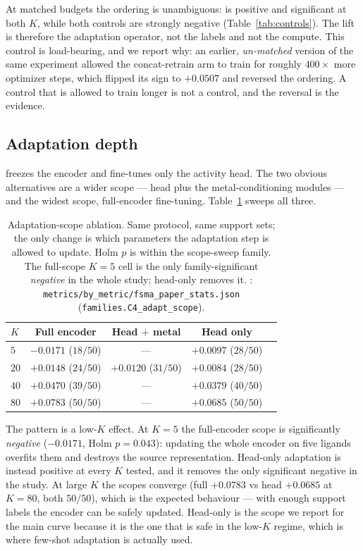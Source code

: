 At matched budgets the ordering is unambiguous: \fsma{} is positive and
significant at both $K$, while both controls are strongly negative
(Table~\ref{tab:controls}). The lift is therefore the adaptation operator, not
the labels and not the compute. This control is load-bearing, and we report why:
an earlier, \emph{un-matched} version of the same experiment allowed the
concat-retrain arm to train for roughly $400\times$ more optimizer steps, which
flipped its sign to $+0.0507$ and reversed the ordering. A control that is
allowed to train longer is not a control, and the reversal is the evidence.

\subsection{Adaptation depth}
\label{sec:ablation:scope}

\fsma{} freezes the encoder and fine-tunes only the activity head. The two
obvious alternatives are a wider scope --- head plus the metal-conditioning
modules --- and the widest scope, full-encoder fine-tuning. Table~\ref{tab:scope}
sweeps all three.

\begin{table}[t]
\centering
\caption{Adaptation-scope ablation. Same protocol, same support sets; the only
change is which parameters the adaptation step is allowed to update. Holm
$p$ is within the scope-sweep family. The full-scope $K{=}5$ cell is the only
family-significant \emph{negative} in the whole study; head-only removes it.
\MEASURED: \texttt{metrics/by\_metric/fsma\_paper\_stats.json}
(\texttt{families.C4\_adapt\_scope}).}
\label{tab:scope}
\small
\begin{tabular}{lcccc}
\toprule
$K$ & Full encoder & Head $+$ metal & Head only \\
\midrule
$5$  & $\mathbf{-0.0171}$ ($18/50$) & --- & $+0.0097$ ($28/50$) \\
$20$ & $+0.0148$ ($24/50$) & $+0.0120$ ($31/50$) & $+0.0084$ ($28/50$) \\
$40$ & $+0.0470$ ($39/50$) & --- & $+0.0379$ ($40/50$) \\
$80$ & $+0.0783$ ($50/50$) & --- & $+0.0685$ ($50/50$) \\
\bottomrule
\end{tabular}
\end{table}

The pattern is a low-$K$ effect. At $K{=}5$ the full-encoder scope is
significantly \emph{negative} ($-0.0171$, Holm $p=0.043$): updating the whole
encoder on five ligands overfits them and destroys the source representation.
Head-only adaptation is instead positive at every $K$ tested, and it removes the
only significant negative in the study. At large $K$ the scopes converge
(full $+0.0783$ vs head $+0.0685$ at $K{=}80$, both $50/50$), which is the
expected behaviour --- with enough support labels the encoder can be safely
updated. Head-only is the scope we report for the main curve because it is the
one that is safe in the low-$K$ regime, which is where few-shot adaptation is
actually used.

